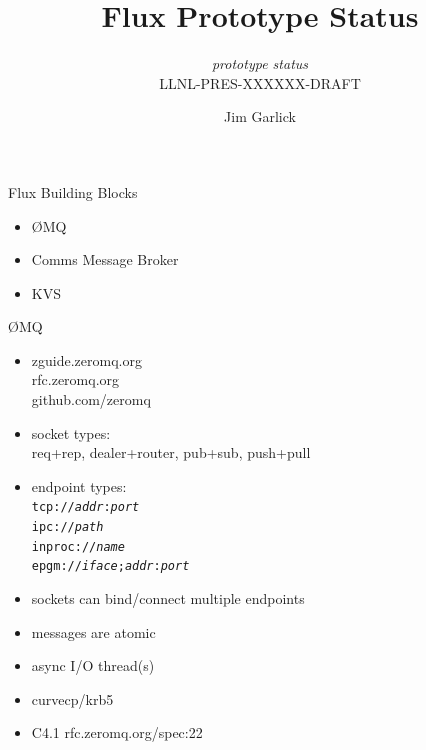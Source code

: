\documentclass[default,pdf,colorBG,slideColor]{prosper}
\title{Flux Prototype Status}
\subtitle{{\small {\em prototype status}\\
LLNL-PRES-XXXXXX-DRAFT}}
\author{Jim Garlick}
\newcommand{\zMQ}{\O{}MQ}
\begin{document}

\begin{slide}{Flux Building Blocks}{\small
\begin{itemize}
  \item{\zMQ}
  \item{Comms Message Broker}
  \item{KVS}
\end{itemize}
}\end{slide}

\begin{slide}{\zMQ}{\small
\begin{minipage}{0.50\textwidth}
\begin{itemize}
  \item{zguide.zeromq.org\\
        rfc.zeromq.org\\
        github.com/zeromq}
  \item{socket types:\\ req+rep, {\blue dealer+router}, {\blue pub+sub},
        push+pull}
  \item{endpoint types:\\
        {\tt tcp://{\em addr}:{\em port}}\\
        {\tt ipc://{\em path}}\\
        {\tt inproc://{\em name}}\\
        {\tt epgm://{\em iface};{\em addr}:{\em port}}}
 \end{itemize}
\end{minipage}
\begin{minipage}{0.50\textwidth}
\begin{itemize}
  \item{sockets can bind/connect multiple endpoints}
  \item{messages are atomic}
  \item{async I/O thread(s)}
  \item{curvecp/krb5}
  \item{C4.1 rfc.zeromq.org/spec:22}
\end{itemize}
\end{minipage}
}\end{slide}
\end{document}
